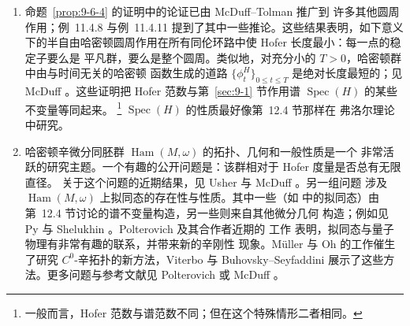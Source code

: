 \begin{remark}
\begin{enumerate}[label=\textup{(\roman*)}]
\item 命题~\ref{prop:9-6-4} 的证明中的论证已由 McDuff--Tolman  推广到
许多其他圆周作用；例~11.4.8 与例~11.4.11 提到了其中一些推论。这些结果表明，如下意义
下的半自由哈密顿圆周作用在所有同伦环路中使 Hofer 长度最小：每一点的稳定子要么是
平凡群，要么是整个圆周。类似地，对充分小的 $T>0$，哈密顿群中由与时间无关的哈密顿
函数生成的道路
$\{\phi_t^H\}_{0\le t\le T}$ 是绝对长度最短的；见 McDuff 。这些证明把
Hofer 范数与第~\ref{sec:9-1} 节作用谱
$\operatorname{Spec}(H)$ 的某些不变量等同起来。
\footnote{一般而言，Hofer 范数与谱范数不同；但在这个特殊情形二者相同。}
$\operatorname{Spec}(H)$ 的性质最好像第~12.4 节那样在 弗洛尔理论中研究。

\item {}哈密顿辛微分同胚群 $\operatorname{Ham}(M,\omega)$ 的拓扑、几何和一般性质是一个
非常活跃的研究主题。一个有趣的公开问题是：该群相对于 Hofer 度量是否总有无限直径。
关于这个问题的近期结果，见 Usher  与 McDuff 。另一组问题
涉及 $\operatorname{Ham}(M,\omega)$ 上拟同态的存在性与性质。其中一些（如
 中的拟同态）由第~12.4 节讨论的谱不变量构造，另一些则来自其他微分几何
构造；例如见 Py  与 Shelukhin 。Polterovich 及其合作者近期的
工作  表明，拟同态与量子物理有非常有趣的联系，并带来新的辛刚性
现象。Müller 与 Oh  的工作催生了研究 $C^0$-辛拓扑的新方法，Viterbo
 与 Buhovsky--Seyfaddini  展示了这些方法。更多问题与参考文献见
Polterovich  或 McDuff 。
\end{enumerate}
\end{remark}
